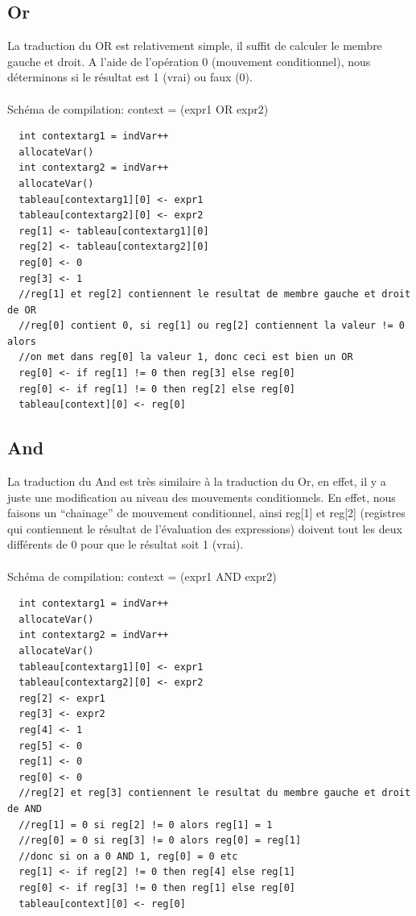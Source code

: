 \documentclass[a4paper,12pt]{report}
\begin{document}
\subsection{Or}
La traduction du OR est relativement simple, il suffit de calculer le membre gauche et droit.
A l'aide de l'opération 0 (mouvement conditionnel), nous déterminons si le résultat est 1 (vrai) ou faux (0).
\\ \\
Schéma de compilation: context = (expr1 OR expr2)
\begin{verbatim}
  int contextarg1 = indVar++
  allocateVar()
  int contextarg2 = indVar++
  allocateVar()
  tableau[contextarg1][0] <- expr1
  tableau[contextarg2][0] <- expr2
  reg[1] <- tableau[contextarg1][0]
  reg[2] <- tableau[contextarg2][0]
  reg[0] <- 0
  reg[3] <- 1
  //reg[1] et reg[2] contiennent le resultat de membre gauche et droit de OR
  //reg[0] contient 0, si reg[1] ou reg[2] contiennent la valeur != 0 alors
  //on met dans reg[0] la valeur 1, donc ceci est bien un OR
  reg[0] <- if reg[1] != 0 then reg[3] else reg[0]
  reg[0] <- if reg[1] != 0 then reg[2] else reg[0]
  tableau[context][0] <- reg[0]
\end{verbatim}

\subsection{And}
La traduction du And est très similaire à la traduction du Or, en effet, il y a juste une modification au niveau des mouvements
conditionnels. En effet, nous faisons un ``chainage'' de mouvement conditionnel, ainsi reg[1] et reg[2] (registres qui contiennent le
résultat de l'évaluation des expressions) doivent tout les deux différents de 0 pour que le résultat soit 1 (vrai).
\\ \\
Schéma de compilation: context = (expr1 AND expr2)
\begin{verbatim}
  int contextarg1 = indVar++
  allocateVar()
  int contextarg2 = indVar++
  allocateVar()
  tableau[contextarg1][0] <- expr1
  tableau[contextarg2][0] <- expr2
  reg[2] <- expr1
  reg[3] <- expr2
  reg[4] <- 1
  reg[5] <- 0
  reg[1] <- 0
  reg[0] <- 0
  //reg[2] et reg[3] contiennent le resultat du membre gauche et droit de AND
  //reg[1] = 0 si reg[2] != 0 alors reg[1] = 1
  //reg[0] = 0 si reg[3] != 0 alors reg[0] = reg[1]
  //donc si on a 0 AND 1, reg[0] = 0 etc
  reg[1] <- if reg[2] != 0 then reg[4] else reg[1]
  reg[0] <- if reg[3] != 0 then reg[1] else reg[0]
  tableau[context][0] <- reg[0]
\end{verbatim}
\end{document}
